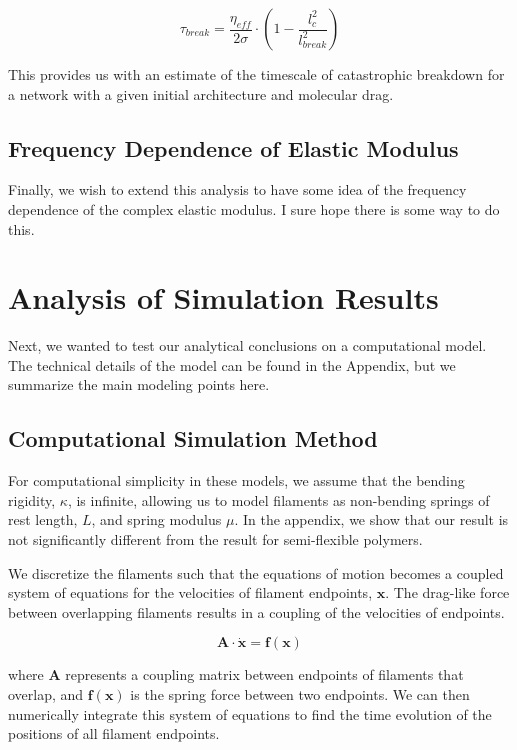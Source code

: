 \documentclass[pre,preprint]{revtex4-1}
\begin{document}
\begin{equation}
\tau_{break} = \frac{\eta_{eff}}{2\sigma}\cdot\left ( 1 -\frac{l_c^2}{l_{break}^2} \right )
\end{equation}

This provides us with an estimate of the timescale of catastrophic breakdown for a network with a given initial architecture and molecular drag.

\subsection{Frequency Dependence of Elastic Modulus}
Finally, we wish to extend this analysis to have some idea of the frequency dependence of the complex elastic modulus.  I sure hope there is some way to do this.


 



\section{Analysis of Simulation Results}

Next, we wanted to test our analytical conclusions on a computational model.  The technical details of the model can be found in the Appendix, but we summarize the main modeling points here.


\subsection{Computational Simulation Method}

For computational simplicity in these models, we assume that the bending rigidity, $\kappa$, is infinite, allowing us to model filaments as non-bending springs of rest length, $L$, and spring modulus $\mu$.  In the appendix, we show that our result is not significantly different from the result for semi-flexible polymers.

We discretize the filaments such that the equations of motion becomes a coupled system of equations for the velocities of filament endpoints, $\mathbf{x}$.  The drag-like force between overlapping filaments results in a coupling of the velocities of endpoints.  

\begin{equation}
\mathbf{A \cdot \dot x} = \mathbf{f(x)}
\end{equation}

where $\mathbf{A }$ represents a coupling matrix between endpoints of filaments that overlap, and $\mathbf{f(x)}$ is the spring force between two endpoints.  We can then numerically integrate this system of equations to find the time evolution of the positions of all filament endpoints.
\end{document}

